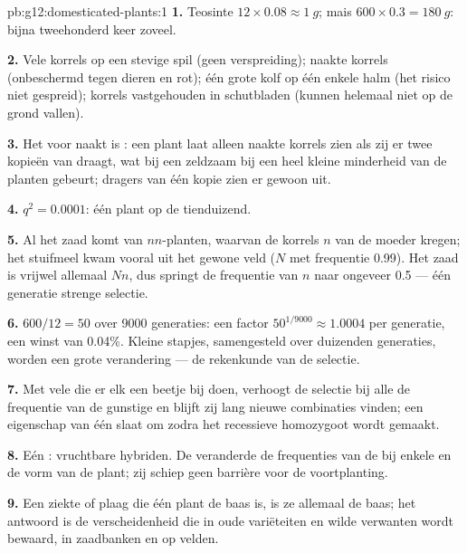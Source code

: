 \begin{solution}{pb:g12:domesticated-plants:1}
\textbf{1.} Teosinte $12 \times 0.08 \approx \qty{1}{g}$; mais $600
\times 0.3 = \qty{180}{g}$: bijna tweehonderd keer zoveel.

\textbf{2.} Vele korrels op een stevige spil (geen verspreiding); naakte
korrels (onbeschermd tegen dieren en rot); één grote kolf op één enkele
halm (het risico niet gespreid); korrels vastgehouden in schutbladen
(kunnen helemaal niet op de grond vallen).

\textbf{3.} Het  voor naakt is : een plant laat alleen
naakte korrels zien als zij er twee kopieën van draagt, wat bij een
zeldzaam  bij een heel kleine minderheid van de planten gebeurt;
dragers van één kopie zien er gewoon uit.

\textbf{4.} $q^2 = 0.0001$: één plant op de tienduizend.

\textbf{5.} Al het zaad komt van $nn$-planten, waarvan de korrels $n$ van
de moeder kregen; het stuifmeel kwam vooral uit het gewone veld ($N$ met
frequentie 0.99). Het zaad is vrijwel allemaal $Nn$, dus springt de
frequentie van $n$ naar ongeveer 0.5 --- één generatie strenge selectie.

\textbf{6.} $600/12 = 50$ over 9000 generaties: een factor $50^{1/9000}
\approx 1.0004$ per generatie, een winst van 0.04\%. Kleine stapjes,
samengesteld over duizenden generaties, worden een grote verandering ---
de rekenkunde van de selectie.

\textbf{7.} Met vele  die er elk een beetje bij doen, verhoogt de
selectie bij alle de frequentie van de gunstige  en blijft zij lang
nieuwe combinaties vinden; een eigenschap van één  slaat om zodra het
recessieve  homozygoot wordt gemaakt.

\textbf{8.} Eén : vruchtbare hybriden. De  veranderde de
frequenties van de  bij enkele  en de vorm van de plant; zij
schiep geen barrière voor de voortplanting.

\textbf{9.} Een ziekte of plaag die één plant de baas is, is ze allemaal
de baas; het antwoord is de verscheidenheid die in oude variëteiten en
wilde verwanten wordt bewaard, in zaadbanken en op velden.


\end{solution}
